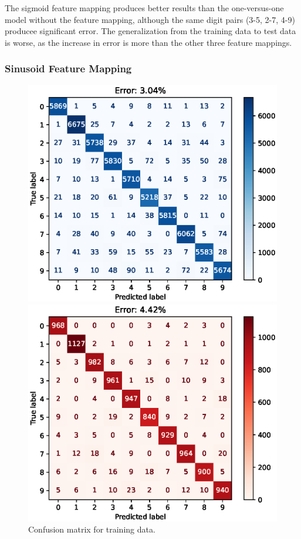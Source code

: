 \documentclass{article}
\begin{document}
The sigmoid feature mapping produces better results than the one-versus-one model without the feature mapping, although the same digit pairs (3-5, 2-7, 4-9) producee significant error.
The generalization from the training data to test data is worse, as the increase in error is more than the other three feature mappings.

\FloatBarrier
\subsubsection{Sinusoid Feature Mapping}
\begin{figure}[h!]
    \centering
    \begin{minipage}{0.5\textwidth}
        \centering
        \includegraphics[width=\textwidth]{images/one_vs_one_training_confusion_matrix_Sine.eps}
        \caption{Confusion matrix for training data.}
    \end{minipage}\hfill
    \begin{minipage}{0.5\textwidth}
        \centering
        \includegraphics[width=\textwidth]{images/one_vs_one_test_confusion_matrix_Sine.eps}

\end{minipage}
\end{figure}
\end{document}
